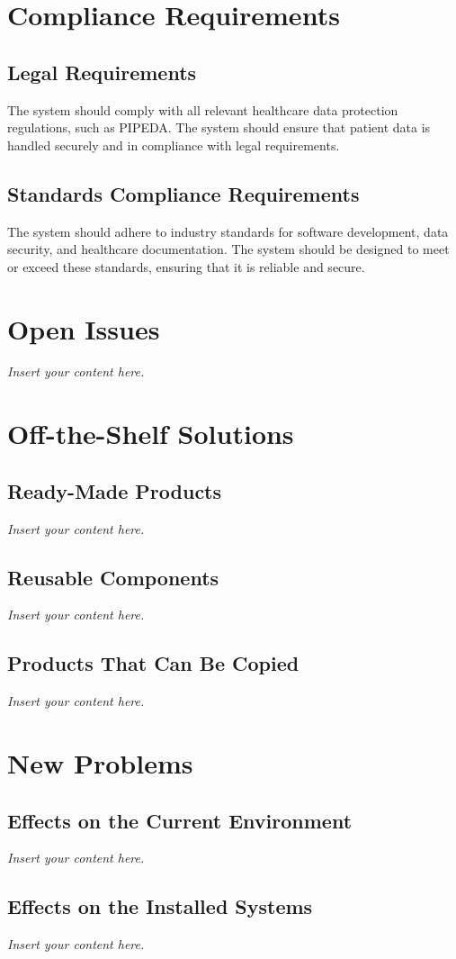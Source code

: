 \documentclass[12pt]{article}
\newcommand{\lips}{\textit{Insert your content here.}}
\begin{document}
\section{Compliance Requirements}
\subsection{Legal Requirements}
The system should comply with all relevant healthcare data protection regulations, such as PIPEDA. The system should ensure that patient data is handled securely and in compliance with legal requirements.

\subsection{Standards Compliance Requirements}
The system should adhere to industry standards for software development, data security, and healthcare documentation. The system should be designed to meet or exceed these standards, ensuring that it is reliable and secure.


\section{Open Issues}
\lips

\section{Off-the-Shelf Solutions}
\subsection{Ready-Made Products}
\lips
\subsection{Reusable Components}
\lips
\subsection{Products That Can Be Copied}
\lips

\section{New Problems}
\subsection{Effects on the Current Environment}
\lips
\subsection{Effects on the Installed Systems}
\lips
\end{document}
